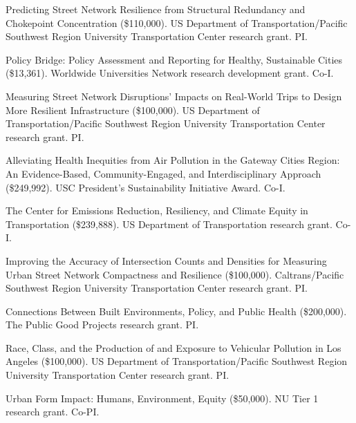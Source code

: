 \documentclass[11pt,letterpaper]{report} %
\begin{document}
\begin{tablist}

\item[2026--27] \tab{}Predicting Street Network Resilience from Structural Redundancy and Chokepoint Concentration (\$110,000). US Department of Transportation/Pacific Southwest Region University Transportation Center research grant. PI\@.

\item[2025--27] \tab{}Policy Bridge: Policy Assessment and Reporting for Healthy, Sustainable Cities (\$13,361). Worldwide Universities Network research development grant. Co-I\@.

\item[2024--25] \tab{}Measuring Street Network Disruptions' Impacts on Real-World Trips to Design More Resilient Infrastructure (\$100,000). US Department of Transportation/Pacific Southwest Region University Transportation Center research grant. PI\@.

\item[2024--25] \tab{}Alleviating Health Inequities from Air Pollution in the Gateway Cities Region: An Evidence-Based, Community-Engaged, and Interdisciplinary Approach (\$249,992). USC President's Sustainability Initiative Award. Co-I\@.

\item[2024--25] \tab{}The Center for Emissions Reduction, Resiliency, and Climate Equity in Transportation (\$239,888). US Department of Transportation research grant. Co-I\@.

\item[2021--22] \tab{}Improving the Accuracy of Intersection Counts and Densities for Measuring Urban Street Network Compactness and Resilience (\$100,000). Caltrans/Pacific Southwest Region University Transportation Center research grant. PI\@.

\item[2020--22] \tab{}Connections Between Built Environments, Policy, and Public Health (\$200,000). The Public Good Projects research grant. PI\@.

\item[2020--21] \tab{}Race, Class, and the Production of and Exposure to Vehicular Pollution in Los Angeles (\$100,000). US Department of Transportation/Pacific Southwest Region University Transportation Center research grant. PI\@.

\item[2019] \tab{}Urban Form Impact: Humans, Environment, Equity (\$50,000). NU Tier 1 research grant. Co-PI\@.


\end{tablist}
\end{document}
